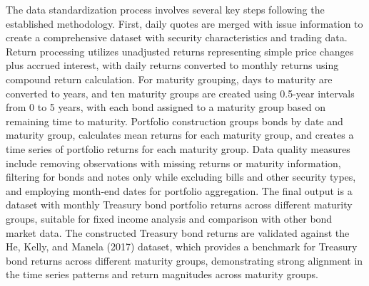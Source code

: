 \documentclass{article}
\begin{document}
The data standardization process involves several key steps following the established methodology. First, daily quotes are merged with issue information to create a comprehensive dataset with security characteristics and trading data. Return processing utilizes unadjusted returns representing simple price changes plus accrued interest, with daily returns converted to monthly returns using compound return calculation. For maturity grouping, days to maturity are converted to years, and ten maturity groups are created using 0.5-year intervals from 0 to 5 years, with each bond assigned to a maturity group based on remaining time to maturity. Portfolio construction groups bonds by date and maturity group, calculates mean returns for each maturity group, and creates a time series of portfolio returns for each maturity group. Data quality measures include removing observations with missing returns or maturity information, filtering for bonds and notes only while excluding bills and other security types, and employing month-end dates for portfolio aggregation. The final output is a dataset with monthly Treasury bond portfolio returns across different maturity groups, suitable for fixed income analysis and comparison with other bond market data. The constructed Treasury bond returns are validated against the He, Kelly, and Manela (2017) dataset, which provides a benchmark for Treasury bond returns across different maturity groups, demonstrating strong alignment in the time series patterns and return magnitudes across maturity groups.


\end{document}
